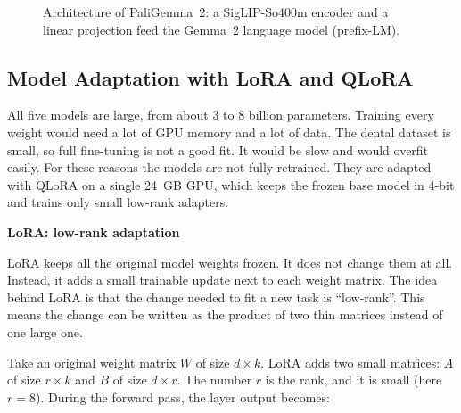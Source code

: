\documentclass[a4paper,12pt]{report}
\newcommand{\minisection}[1]{%
  \vspace{1ex}
  \noindent\textbf{#1}\par
  \vspace{0.5ex}
}
\begin{document}
\begin{figure}[H]
    \centering
    \caption{Architecture of PaliGemma~2: a SigLIP-So400m encoder and a linear projection feed the Gemma~2 language model (prefix-LM).}
    \label{fig:paligemma-arch}
\end{figure}

\subsection{Model Adaptation with LoRA and QLoRA}
\label{sec:lora}

All five models are large, from about 3 to 8 billion parameters. Training every weight would need a lot of GPU memory and a lot of data. The dental dataset is small, so full fine-tuning is not a good fit. It would be slow and would overfit easily. For these reasons the models are not fully retrained. They are adapted with QLoRA on a single 24~GB GPU, which keeps the frozen base model in 4-bit and trains only small low-rank adapters.

\minisection{LoRA: low-rank adaptation}

LoRA keeps all the original model weights frozen. It does not change them at all. Instead, it adds a small trainable update next to each weight matrix. The idea behind LoRA is that the change needed to fit a new task is ``low-rank''. This means the change can be written as the product of two thin matrices instead of one large one.

Take an original weight matrix $W$ of size $d \times k$. LoRA adds two small matrices: $A$ of size $r \times k$ and $B$ of size $d \times r$. The number $r$ is the rank, and it is small (here $r = 8$). During the forward pass, the layer output becomes:
\end{document}
